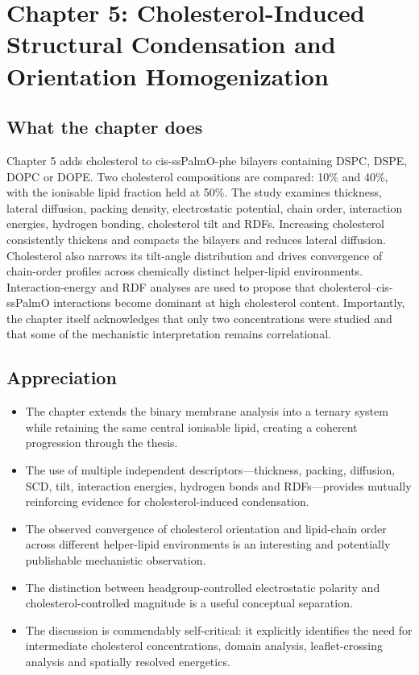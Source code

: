 \documentclass[11pt,a4paper]{article}
\begin{document}
\section{Chapter 5: Cholesterol-Induced Structural Condensation and Orientation Homogenization}

\subsection*{What the chapter does}

Chapter 5 adds cholesterol to cis-ssPalmO-phe bilayers containing DSPC, DSPE, DOPC or DOPE. Two cholesterol compositions are compared: 10\% and 40\%, with the ionisable lipid fraction held at 50\%. The study examines thickness, lateral diffusion, packing density, electrostatic potential, chain order, interaction energies, hydrogen bonding, cholesterol tilt and RDFs. Increasing cholesterol consistently thickens and compacts the bilayers and reduces lateral diffusion. Cholesterol also narrows its tilt-angle distribution and drives convergence of chain-order profiles across chemically distinct helper-lipid environments. Interaction-energy and RDF analyses are used to propose that cholesterol--cis-ssPalmO interactions become dominant at high cholesterol content. Importantly, the chapter itself acknowledges that only two concentrations were studied and that some of the mechanistic interpretation remains correlational.

\subsection*{Appreciation}

\begin{itemize}[leftmargin=*]
\item The chapter extends the binary membrane analysis into a ternary system while retaining the same central ionisable lipid, creating a coherent progression through the thesis.
\item The use of multiple independent descriptors---thickness, packing, diffusion, SCD, tilt, interaction energies, hydrogen bonds and RDFs---provides mutually reinforcing evidence for cholesterol-induced condensation.
\item The observed convergence of cholesterol orientation and lipid-chain order across different helper-lipid environments is an interesting and potentially publishable mechanistic observation.
\item The distinction between headgroup-controlled electrostatic polarity and cholesterol-controlled magnitude is a useful conceptual separation.
\item The discussion is commendably self-critical: it explicitly identifies the need for intermediate cholesterol concentrations, domain analysis, leaflet-crossing analysis and spatially resolved energetics.
\end{itemize}
\end{document}
